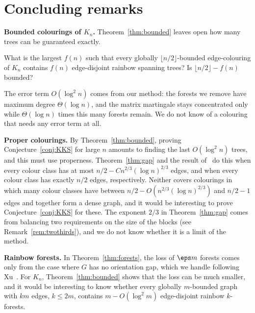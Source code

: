 \section{Concluding remarks}\label{sec:final}
\noindent\textbf{Bounded colourings of $K_n$.}
Theorem~\ref{thm:bounded} leaves open how many trees can be guaranteed exactly.

\begin{question}
What is the largest $f(n)$ such that every globally $\lfloor n/2\rfloor$-bounded edge-colouring of $K_n$ contains $f(n)$ edge-disjoint rainbow spanning trees? Is $\lfloor n/2\rfloor-f(n)$ bounded?
\end{question}

The error term $O(\log^2n)$ comes from our method: the forests we remove have maximum degree $\Theta(\log n)$, and the matrix martingale stays concentrated only while $\Theta(\log n)$ times this many forests remain. We do not know of a colouring that needs any error term at all.

\smallskip

\noindent\textbf{Proper colourings.}
By Theorem~\ref{thm:bounded}, proving Conjecture~\ref{conj:KKS} for large $n$ amounts to finding the last $O(\log^2 n)$ trees, and this must use properness.
Theorem~\ref{thm:gap} and the result of~\cite{GKMO} do this when every colour class has at most $n/2-Cn^{2/3}(\log n)^{2/3}$ edges, and when every colour class has exactly $n/2$ edges, respectively.
Neither covers colourings in which many colour classes have between $n/2-O(n^{2/3}(\log n)^{2/3})$ and $n/2-1$ edges and together form a dense graph, and it would be interesting to prove Conjecture~\ref{conj:KKS} for these.
The exponent $2/3$ in Theorem~\ref{thm:gap} comes from balancing two requirements on the size of the blocks (see Remark~\ref{rem:twothirds}), and we do not know whether it is a limit of the method.

\smallskip

\noindent\textbf{Rainbow forests.}
In Theorem~\ref{thm:forests}, the loss of $\eps m$ forests comes only from the case where $G$ has no orientation gap, which we handle following Xu~\cite{Xu}.
For $K_n$, Theorem~\ref{thm:bounded} shows that the loss can be much smaller, and it would be interesting to know whether every globally $m$-bounded graph with $km$ edges, $k\le2m$, contains $m-O(\log^2m)$ edge-disjoint rainbow $k$-forests.
